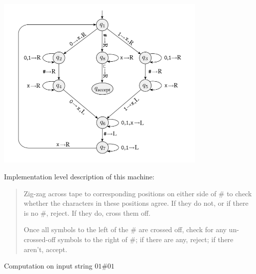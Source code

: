 \documentclass[12pt, oneside]{article}
\begin{document}
\begin{multicols}{2}
\vspace{-20pt}
\begin{center}
\includegraphics[width=4in]{../../resources/machines/Lect13TM3.png}
\end{center}

Implementation level description of this machine:
\begin{quote}
Zig-zag across tape to corresponding positions on either side of $\#$ to check whether the 
characters in these positions agree. If they do not, or if there is no $\#$, reject. If they 
do, cross them off.

Once all symbols to the left of the $\#$ are crossed off, check for any un-crossed-off symbols 
to the right of $\#$; if there are any, reject; if there aren't, accept.
\end{quote}

\columnbreak

Computation on  input  string  $01\#01$


\end{multicols}
\end{document}
